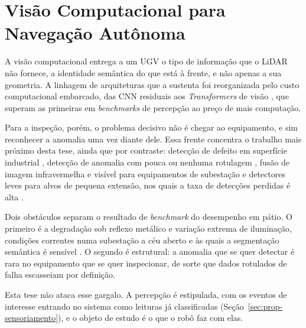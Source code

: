 \section{Visão Computacional para Navegação Autônoma}

A visão computacional entrega a um \ac{UGV} o tipo de informação que o \ac{LiDAR} não
fornece, a identidade semântica do que está à frente, e não apenas a sua geometria. A
linhagem de arquiteturas que a sustenta foi reorganizada pelo custo computacional
embarcado, das \ac{CNN} residuais \cite{He2016} aos \textit{Transformers} de visão
\cite{Carion2020, Liu2021SwinTransformer}, que superam as primeiras em \textit{benchmarks}
de percepção ao preço de mais computação.

Para a inspeção, porém, o problema decisivo não é chegar ao equipamento, e sim reconhecer
a anomalia uma vez diante dele. Essa frente concentra o trabalho mais próximo desta tese,
ainda que por contraste: detecção de defeito em superfície industrial
\cite{Ullah2020DefectDetection}, detecção de anomalia com pouca ou nenhuma rotulagem
\cite{Bergmann2020}, fusão de imagem infravermelha e visível para equipamentos de
subestação \cite{Chi2024LMDFusion} e detectores leves para alvos de pequena extensão, nos
quais a taxa de detecções perdidas é alta \cite{Wang2024SmallTargets}.

Dois obstáculos separam o resultado de \textit{benchmark} do desempenho em pátio. O
primeiro é a degradação sob reflexo metálico e variação extrema de iluminação, condições
correntes numa subestação a céu aberto e às quais a segmentação semântica é sensível
\cite{Pfeuffer2019, Cai2025AttentionSeg}. O segundo é estrutural: a anomalia que se quer
detectar é rara no equipamento que se quer inspecionar, de sorte que dados rotulados de
falha escasseiam por definição.

Esta tese não ataca esse gargalo. A percepção é estipulada, com os eventos de interesse
entrando no sistema como leituras já classificadas (Seção~\ref{sec:prop-sensoriamento}),
e o objeto de estudo é o que o robô faz com elas.
